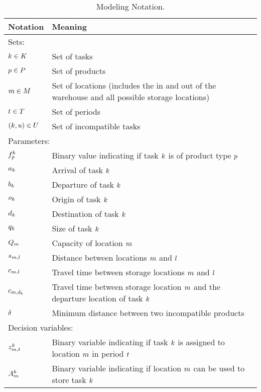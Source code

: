 \documentclass[a4paper,twoside,11pt]{article}
\begin{document}
\begin{table}[htpb]
    \centering
    \caption{Modeling Notation.}
    \label{tab:notation}
    \begin{tabular}{ll}
        \toprule
        \textbf{Notation} & \textbf{Meaning} \\
        \midrule
        \multicolumn{2}{l}{Sets:} \\
        $k \in K$ & Set of tasks \\
        $p \in P$ & Set of products \\
        $m \in M$ & Set of locations (includes the in and out of the warehouse and all possible storage locations)\\
        $t \in T$ & Set of periods\\
        $(k,u) \in U$ & Set of incompatible tasks\\
        \midrule
        \multicolumn{2}{l}{Parameters:} \\
        $f^k_p$ & Binary value indicating if task $k$ is of product type $p$ \\
        $a_k$ & Arrival of task $k$ \\
        $b_k$ & Departure of task $k$ \\
        $o_k$ & Origin of task $k$ \\
        $d_k$ & Destination of task $k$ \\
        $q_k$ & Size of task $k$ \\
        $Q_m$ & Capacity of location $m$ \\
        $s_{m,l}$ & Distance between locations $m$ and $l$ \\
        $c_{m,l}$ & Travel time between storage locations $m$ and $l$ \\
        $c_{m,d_k}$ & Travel time between storage location $m$ and the departure location of task $k$ \\
        $\delta$ & Minimum distance between two incompatible products \\
        \midrule
        \multicolumn{2}{l}{Decision variables:} \\
        $z^k_{m,t}$ & Binary variable indicating if task $k$ is assigned to location $m$ in period $t$\\
        $A^k_m$ & Binary variable indicating if location $m$ can be used to store task $k$\\
        \bottomrule
    \end{tabular}
\end{table}
\end{document}
